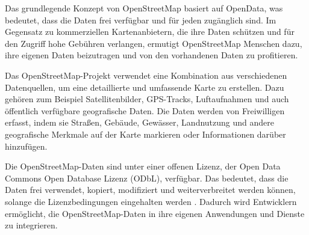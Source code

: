 Das grundlegende Konzept von OpenStreetMap basiert auf OpenData, was bedeutet, dass die Daten frei
verfügbar und für jeden zugänglich sind. Im Gegensatz zu kommerziellen Kartenanbietern, die ihre
Daten schützen und für den Zugriff hohe Gebühren verlangen, ermutigt OpenStreetMap Menschen dazu,
ihre eigenen Daten beizutragen und von den vorhandenen Daten zu profitieren.

Das OpenStreetMap-Projekt verwendet eine Kombination aus verschiedenen Datenquellen, um eine
detaillierte und umfassende Karte zu erstellen. Dazu gehören zum Beispiel Satellitenbilder,
GPS-Tracks, Luftaufnahmen und auch öffentlich verfügbare geografische Daten. Die Daten werden von
Freiwilligen erfasst, indem sie Straßen, Gebäude, Gewässer, Landnutzung und andere geografische
Merkmale auf der Karte markieren oder Informationen darüber hinzufügen.

Die OpenStreetMap-Daten sind unter einer offenen Lizenz, der Open Data Commons Open Database Lizenz
(ODbL), verfügbar. Das bedeutet, dass die Daten frei verwendet, kopiert, modifiziert und
weiterverbreitet werden können, solange die Lizenzbedingungen eingehalten werden \cite{osm.license}.
Dadurch wird Entwicklern ermöglicht, die OpenStreetMap-Daten in ihre eigenen Anwendungen und
Dienste zu integrieren.